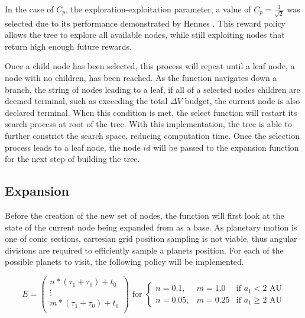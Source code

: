 \documentclass[letterpaper, preprint, paper,11pt]{AAS}	%
\begin{document}
In the case of $C_p$, the exploration-exploitation parameter, a value of $C_p = \frac{1}{\sqrt{2}}$ was selected due to its performance demonstrated by Hennes \cite{Hennes2015}. This reward policy allows the tree to explore all available nodes, while still exploiting nodes that return high enough future rewards.

Once a child node has been selected, this process will repeat until a leaf node, a node with no children, has been reached. As the function navigates down a branch, the string of nodes leading to a leaf, if all of a selected nodes children are deemed terminal, such as exceeding the total $\Delta V$ budget, the current node is also declared terminal. When this condition is met, the select function will restart its search process at root of the tree. With this implementation, the tree is able to further constrict the search space, reducing computation time. Once the selection process leads to a leaf node, the node $id$ will be passed to the expansion function for the next step of building the tree. %

\subsection{Expansion}
Before the creation of the new set of nodes, the function will first look at the state of the current node being expanded from as a base. As planetary motion is one of conic sections, cartesian grid position sampling is not viable, thus angular divisions are required to efficiently sample a planets position. For each of the possible planets to visit, the following policy will be implemented. 

\begin{equation}
    \label{eq:ephemArray}
    E = 
    \left(\begin{array}{c}
        n*(\tau_1 + \tau_0) + t_0 \\ 
        \vdots \\
        m*(\tau_1 + \tau_0) + t_0 \\
    \end{array}\right)
    \text{ for } 
    \left\{\begin{array}{lll} 
        n = 0.1, & m = 1.0 &\text{if } a_1 < 2 \text{ AU} \\ 
        n = 0.05, & m = 0.25 &\text{if } a_1 \geq 2 \text{ AU}
    \end{array}\right.
\end{equation}
\end{document}
